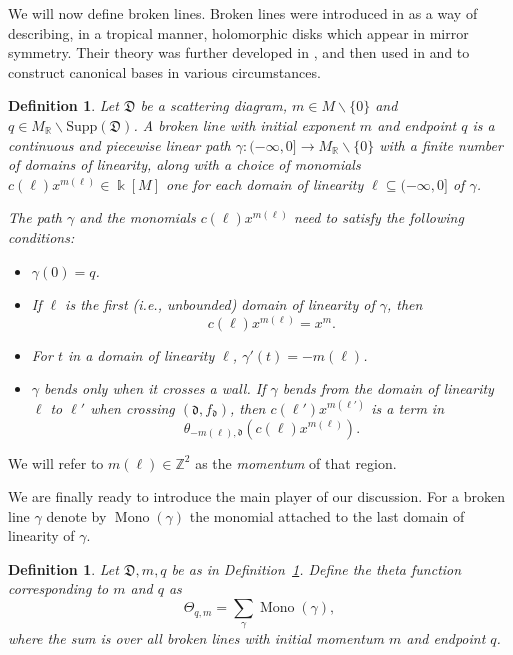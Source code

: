\documentclass[11pt]{amsart}
\newtheorem{defn}[theorem]{Definition}
\theoremstyle{remark}
\numberwithin{equation}{section}
\newcommand{\RR}{\mathbb{R}}
\newcommand{\fd}{\mathfrak{d}}
\newcommand{\fD}{\mathfrak{D}}
\newcommand{\Mono}{\operatorname{Mono}}
\begin{document}
We will now define broken lines. Broken lines were introduced in \cite{G10} as a
way of describing, in a tropical manner,  holomorphic disks which appear in
mirror symmetry.  Their theory was further developed in \cite{CPS}, and then
used in \cite{GHK11} and \cite{GHKK} to construct canonical bases in various
circumstances.

\begin{defn} 
  \label{brokendef}
  Let $\fD$ be a scattering diagram, $m \in M \smallsetminus \{0\}$ and $q \in
  M_{\RR} \smallsetminus \text{Supp}(\fD)$.  A \emph{broken line} with initial
  \emph{exponent} $m$ and endpoint $q$ is a continuous and piecewise linear path
  $\gamma : ( - \infty , 0] \rightarrow M_{\mathbb{R}} \smallsetminus \{ 0\} $ with
  a finite number of domains of linearity, along with a choice of monomials
  $c(\ell) x^{m(\ell)} \in \Bbbk[M]$ one for each domain of linearity $\ell \subseteq ( -
  \infty, 0]$ of $\gamma$. 
  
  The path $\gamma$ and the monomials $c(\ell) x^{m(\ell)}$ need to satisfy the
  following conditions:
  \begin{itemize}
    \item 
      $\gamma(0) = q$.
    
    \item 
      If $\ell$ is the first (i.e., unbounded) domain of linearity of $\gamma$,
      then 
      \[
        c(\ell) x^{m(\ell)} = x^{m}.
      \]

    \item 
      For $t$ in a domain of linearity $\ell$, $\gamma'(t) = -m(\ell)$.

    \item 
      $\gamma$ bends only when it crosses a wall. If $\gamma$ bends from the
      domain of linearity $\ell$ to $ \ell'$ when crossing $(\fd, f_{\fd})$, then
      $c(\ell')x^{m(\ell')}$ is a term in 
      \[
        \theta_{-m(\ell), \fd} \left(c(\ell) x^{m(\ell)}\right).
      \]
  \end{itemize}
\end{defn}
We will refer to $m(\ell)\in \mathbb{Z}^2$ as the \emph{momentum} of that region.

We are finally ready to introduce the main player of our discussion.
For a broken line $\gamma$  denote by
$\Mono (\gamma)$ the monomial attached to the last domain of linearity of $\gamma$.
\begin{defn}
  Let $\fD, m, q$ be as in Definition~\ref{brokendef}.  Define the \emph{theta function} corresponding to $m$ and $q$
  as
  \[ 
    \Theta_{q, m} = \sum_{\gamma} \Mono (\gamma), 
  \] 
  where the sum is over all broken lines with initial momentum $m$ and endpoint
  $q$.
\end{defn}
\end{document}
